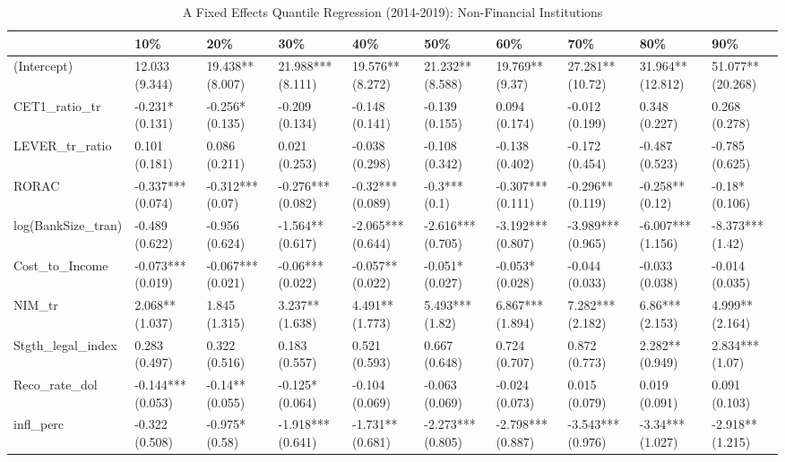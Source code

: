 \begin{table}[ht]
\centering
\caption{A Fixed Effects Quantile Regression (2014-2019): Non-Financial Institutions} 
\begingroup\small
\begin{tabular}{llllllllll}
  \toprule
 & 10\% & 20\% & 30\% & 40\% & 50\% & 60\% & 70\% & 80\% & 90\% \\ 
  \midrule
(Intercept) & 12.033 (9.344) & 19.438** (8.007) & 21.988*** (8.111) & 19.576** (8.272) & 21.232** (8.588) & 19.769** (9.37) & 27.281** (10.72) & 31.964** (12.812) & 51.077** (20.268) \\ 
  CET1\_ratio\_tr & -0.231* (0.131) & -0.256* (0.135) & -0.209 (0.134) & -0.148 (0.141) & -0.139 (0.155) & 0.094 (0.174) & -0.012 (0.199) & 0.348 (0.227) & 0.268 (0.278) \\ 
  LEVER\_tr\_ratio & 0.101 (0.181) & 0.086 (0.211) & 0.021 (0.253) & -0.038 (0.298) & -0.108 (0.342) & -0.138 (0.402) & -0.172 (0.454) & -0.487 (0.523) & -0.785 (0.625) \\ 
  RORAC & -0.337*** (0.074) & -0.312*** (0.07) & -0.276*** (0.082) & -0.32*** (0.089) & -0.3*** (0.1) & -0.307*** (0.111) & -0.296** (0.119) & -0.258** (0.12) & -0.18* (0.106) \\ 
  log(BankSize\_tran) & -0.489 (0.622) & -0.956 (0.624) & -1.564** (0.617) & -2.065*** (0.644) & -2.616*** (0.705) & -3.192*** (0.807) & -3.989*** (0.965) & -6.007*** (1.156) & -8.373*** (1.42) \\ 
  Cost\_to\_Income & -0.073*** (0.019) & -0.067*** (0.021) & -0.06*** (0.022) & -0.057** (0.022) & -0.051* (0.027) & -0.053* (0.028) & -0.044 (0.033) & -0.033 (0.038) & -0.014 (0.035) \\ 
  NIM\_tr & 2.068** (1.037) & 1.845 (1.315) & 3.237** (1.638) & 4.491** (1.773) & 5.493*** (1.82) & 6.867*** (1.894) & 7.282*** (2.182) & 6.86*** (2.153) & 4.999** (2.164) \\ 
  Stgth\_legal\_index & 0.283 (0.497) & 0.322 (0.516) & 0.183 (0.557) & 0.521 (0.593) & 0.667 (0.648) & 0.724 (0.707) & 0.872 (0.773) & 2.282** (0.949) & 2.834*** (1.07) \\ 
  Reco\_rate\_dol & -0.144*** (0.053) & -0.14** (0.055) & -0.125* (0.064) & -0.104 (0.069) & -0.063 (0.069) & -0.024 (0.073) & 0.015 (0.079) & 0.019 (0.091) & 0.091 (0.103) \\ 
  infl\_perc & -0.322 (0.508) & -0.975* (0.58) & -1.918*** (0.641) & -1.731** (0.681) & -2.273*** (0.805) & -2.798*** (0.887) & -3.543*** (0.976) & -3.34*** (1.027) & -2.918** (1.215) \\ 

\end{tabular}
\end{table}
